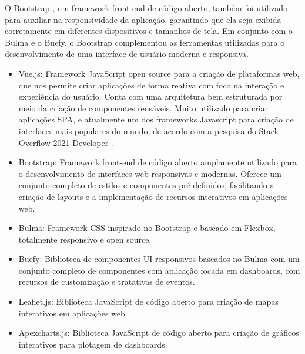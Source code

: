 \documentclass[tcc,capa]{texufpel}
\begin{document}
O Bootstrap \cite{bootstrap:2023}, um framework front-end de código aberto, também foi utilizado para auxiliar na responsividade da aplicação, garantindo que ela seja exibida corretamente em diferentes dispositivos e tamanhos de tela. Em conjunto com o Bulma e o Buefy, o Bootstrap complementou as ferramentas utilizadas para o desenvolvimento de uma interface de usuário moderna e responsiva.
\begin{itemize}
    \item Vue.js: Framework JavaScript open source para a criação de plataformas web, que nos permite criar aplicações de forma reativa com foco na interação e experiência do usuário. Conta com uma arquitetura bem estruturada por meio da criação de componentes reusáveis. Muito utilizado para criar aplicações SPA, e atualmente um dos frameworks Javascript para criação de interfaces mais populares do mundo, de acordo com a pesquisa do Stack Overflow 2021 Developer \cite{stackoverflow:2022}.
    \item Bootstrap: Framework front-end de código aberto amplamente utilizado para o desenvolvimento de interfaces web responsivas e modernas. Oferece um conjunto completo de estilos e componentes pré-definidos, facilitando a criação de layouts e a implementação de recursos interativos em aplicações web.
    \item Bulma: Framework CSS inspirado no Bootstrap e baseado em Flexbox, totalmente responsivo e open source.
    \item Buefy: Biblioteca de componentes UI responsivos baseados no Bulma com um conjunto completo de componentes com aplicação focada em dashboards, com recursos de customização e tratativas de eventos.
    \item Leaflet.js: Biblioteca JavaScript de código aberto para criação de mapas interativos em aplicações web.
    \item Apexcharts.js: Biblioteca JavaScript de código aberto para criação de gráficos interativos para plotagem de dashboards.
\end{itemize}
\end{document}
